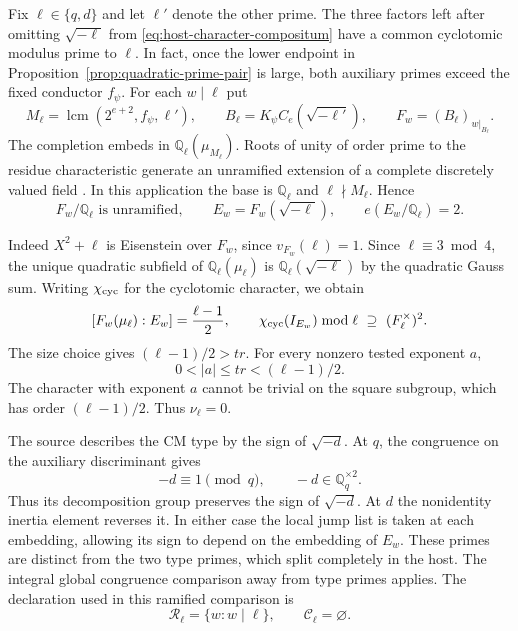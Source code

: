 Fix \(\ell\in\{q,d\}\) and let \(\ell'\) denote the other prime.
The three factors left after omitting \(\sqrt{-\ell}\) from
\eqref{eq:host-character-compositum} have a common cyclotomic modulus
prime to \(\ell\). In fact, once the lower endpoint in
Proposition~\ref{prop:quadratic-prime-pair} is large, both auxiliary
primes exceed the fixed conductor \(f_\psi\). For each \(w\mid\ell\) put
\[
 M_\ell=\operatorname{lcm}(2^{e+2},f_\psi,\ell'),\qquad
 B_\ell=K_\psi C_e(\sqrt{-\ell'}),\qquad F_w=(B_\ell)_{w|_{B_\ell}}.
\]
The completion embeds in \(\mathbb Q_\ell(\mu_{M_\ell})\). Roots of
unity of order prime to the residue characteristic generate an
unramified extension of a complete discretely valued field
\cite[Corollary~10.16]{sutherland-local-fields}. In this application
the base is \(\mathbb Q_\ell\) and \(\ell\nmid M_\ell\). Hence
\begin{equation}\label{eq:host-auxiliary-completion}
 F_w/\mathbb Q_\ell\text{ is unramified},\qquad
 E_w=F_w(\sqrt{-\ell}),\qquad e(E_w/\mathbb Q_\ell)=2 .
\end{equation}

Indeed \(X^2+\ell\) is Eisenstein over \(F_w\), since
\(v_{F_w}(\ell)=1\). Since
\(\ell\equiv3\bmod4\), the unique quadratic subfield of
\(\mathbb Q_\ell(\mu_\ell)\) is \(\mathbb Q_\ell(\sqrt{-\ell})\)
by the quadratic Gauss sum. Writing \(\chi_{\rm cyc}\) for the cyclotomic character, we obtain
\[
 [F_w(\mu_\ell):E_w]=\frac{\ell-1}{2},
 \qquad
 \chi_{\rm cyc}(I_{E_w})\bmod\ell\ \supseteq\
           (\mathbb F_\ell^\times)^2 .
\]
The size choice gives \((\ell-1)/2>tr\). For every nonzero tested exponent \(a\),
\[
 0<|a|\le tr<(\ell-1)/2.
\]
The character with exponent \(a\) cannot be trivial on the square subgroup, which has order \((\ell-1)/2\). Thus \(\nu_\ell=0\).

The source describes the CM type by the sign of
\(\sqrt{-d}\). At \(q\), the congruence on the auxiliary discriminant gives
\[
 -d\equiv1\pmod q,\qquad -d\in\mathbb Q_q^{\times2}.
\]
Thus its decomposition group preserves the sign of \(\sqrt{-d}\). At \(d\) the nonidentity inertia element reverses it.
In either case the local jump list is taken at each
embedding, allowing its sign to depend on the
embedding of \(E_w\). These primes are distinct from
the two type primes, which split completely in the host.
The integral global congruence comparison away from
type primes applies. The declaration used in this ramified comparison is
\[
 \mathcal R_\ell=\{w:w\mid\ell\},\qquad \mathcal C_\ell=\varnothing.
\]

